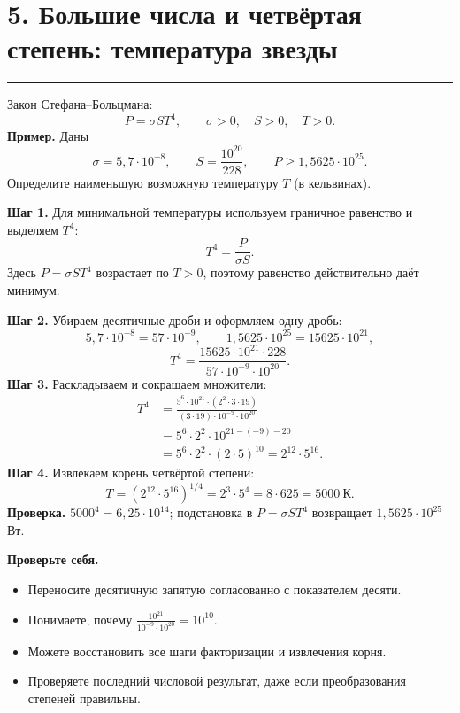 \documentclass[a4paper,12pt]{article}
\newcommand{\sectionline}{\par\vspace{2pt}\noindent\textcolor{accent}{\rule{\linewidth}{0.5pt}}\par\vspace{3pt}}
\newcommand{\focus}[1]{\textbf{\textcolor{darkaccent}{#1}}}
\newcommand{\checklist}[1]{\par\smallskip\textcolor{darkaccent}{\textbf{Проверьте себя.}}\par\begin{itemize}[label=$\square$]#1\end{itemize}}
\begin{document}
\clearpage
\section*{5. Большие числа и четвёртая степень: температура звезды}
\sectionline
Закон Стефана--Больцмана:
\[
P=\sigma S T^4,\qquad\sigma>0,\quad S>0,\quad T>0.
\]
\textbf{Пример.} Даны
\[
\sigma=5{,}7\cdot10^{-8},\qquad
S=\frac{10^{20}}{228},\qquad
P\ge 1{,}5625\cdot10^{25}.
\]
Определите наименьшую возможную температуру \(T\) (в кельвинах).

\textbf{Шаг 1.} Для минимальной температуры используем граничное равенство и выделяем \(T^4\):
\[
T^4=\frac{P}{\sigma S}.
\]
Здесь \(P=\sigma ST^4\) возрастает по \(T>0\), поэтому равенство действительно даёт минимум.

\textbf{Шаг 2.} Убираем десятичные дроби и оформляем одну дробь:
\[
5{,}7\cdot10^{-8}=57\cdot10^{-9},\qquad
1{,}5625\cdot10^{25}=15625\cdot10^{21},
\]
\[
T^4=\frac{15625\cdot10^{21}\cdot228}
{57\cdot10^{-9}\cdot10^{20}}.
\]
\textbf{Шаг 3.} Раскладываем и сокращаем множители:
\[
\begin{aligned}
T^4
&=\frac{5^6\cdot10^{21}\cdot(2^2\cdot3\cdot19)}
{(3\cdot19)\cdot10^{-9}\cdot10^{20}}\\
&=5^6\cdot2^2\cdot10^{21-(-9)-20}\\
&=5^6\cdot2^2\cdot(2\cdot5)^{10}
=2^{12}\cdot5^{16}.
\end{aligned}
\]
\textbf{Шаг 4.} Извлекаем корень четвёртой степени:
\[
T=(2^{12}\cdot5^{16})^{1/4}
=2^3\cdot5^4=8\cdot625=\boxed{5000\ \text{К}}.
\]
\focus{Проверка.} \(5000^4=6{,}25\cdot10^{14}\); подстановка в \(P=\sigma ST^4\) возвращает \(1{,}5625\cdot10^{25}\) Вт.

\checklist{
\item Переносите десятичную запятую согласованно с показателем десяти.
\item Понимаете, почему \(\frac{10^{21}}{10^{-9}\cdot10^{20}}=10^{10}\).
\item Можете восстановить все шаги факторизации и извлечения корня.
\item Проверяете последний числовой результат, даже если преобразования степеней правильны.
}
\end{document}
